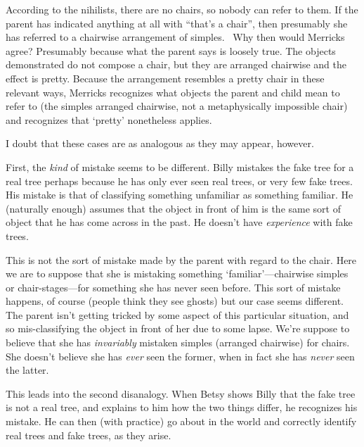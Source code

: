 \documentclass[11pt]{article}
\begin{document}
\begin{spacing}{1.25}
According to the nihilists, there are no chairs, so nobody can refer
to them.  If the parent has indicated anything at all with ``that's a
chair'', then presumably she has referred to a chairwise arrangement
of simples.
%
%
\ Why then would Merricks agree?  Presumably because what the parent
says is loosely true.  The objects demonstrated do not compose a
chair, but they are arranged chairwise and the effect is pretty.
Because the arrangement resembles a pretty chair in these relevant
ways, Merricks recognizes what objects the parent and child mean to
refer to (the simples arranged chairwise, not a metaphysically
impossible chair) and recognizes that `pretty' nonetheless applies.

I doubt that these cases are as analogous as they may appear, however.

First, the {\em kind} of mistake seems to be different.  Billy
mistakes the fake tree for a real tree perhaps because he has only
ever seen real trees, or very few fake trees.  His mistake is that of
classifying something unfamiliar as something familiar.  He (naturally
enough) assumes that the object in front of him is the same sort of
object that he has come across in the past.  He doesn't have {\em
  experience} with fake trees.

This is not the sort of mistake made by the parent with regard to the
chair.  Here we are to suppose that she is mistaking something
`familiar'---chairwise simples or chair-stages---for something she has
never seen before.  This sort of mistake happens, of course (people
think they see ghosts) but our case seems different.  The parent isn't
getting tricked by some aspect of this particular situation, and so
mis-classifying the object in front of her due to some lapse.  We're
suppose to believe that she has {\em invariably} mistaken simples
(arranged chairwise) for chairs.  She doesn't believe she has {\em
  ever} seen the former, when in fact she has {\em never} seen the
latter.

This leads into the second disanalogy.  When Betsy shows Billy that
the fake tree is not a real tree, and explains to him how the two
things differ, he recognizes his mistake.  He can then (with practice)
go about in the world and correctly identify real trees and fake
trees, as they arise.


\end{spacing}
\end{document}
